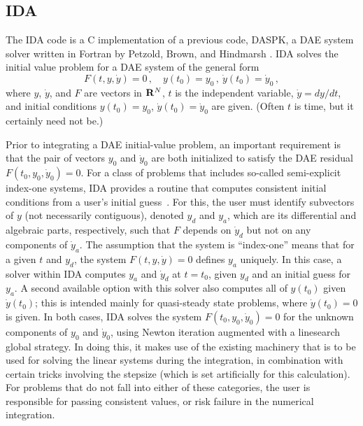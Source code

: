 \subsection{IDA}\label{ss:IDA}

The IDA code is a C implementation of a previous code, DASPK, a DAE
system solver written in Fortran by Petzold, Brown, and Hindmarsh
\cite{BHP:94,BCP:96}.  IDA solves the initial value problem for 
a DAE system of the general form
\begin{equation}\label{e:DAE}
  F(t,y,{\dot y}) = 0 \, ,
  \quad y(t_0) = y_0 \, ,~ {\dot y}(t_0) = {\dot y}_0 \, ,
\end{equation}
where $y$, ${\dot y}$, and $F$ are vectors in ${\bf R}^N$, $t$ is the independent
variable, ${\dot y} = dy/dt$, 
and initial conditions $y(t_0) = y_0$, ${\dot y}(t_0) = {\dot y}_0$ 
are given.  (Often $t$ is time, but it certainly need not be.)

Prior to integrating a DAE initial-value problem, an important requirement 
is that the pair of vectors $y_0$ and ${\dot y_0}$ are both initialized to
satisfy the DAE residual $F(t_0,y_0, {\dot y}_0) = 0$.
For a class of problems that includes so-called
semi-explicit index-one systems, IDA provides a routine that computes
consistent initial conditions from a user's initial guess~\cite{BHP:98}.  
For this, the user must identify subvectors of $y$
(not necessarily contiguous), denoted $y_d$ and $y_a$, which are its
differential and algebraic parts, respectively, such that $F$ depends
on ${\dot y}_d$ but not on any components of ${\dot y}_a$.  The assumption that
the system is ``index-one'' means that for a given $t$ and $y_d$, the
system $F(t,y,{\dot y}) = 0$ defines $y_a$ uniquely.  In this case, a solver
within IDA computes $y_a$ and ${\dot y}_d$ at $t = t_0$, given $y_d$ and an
initial guess for $y_a$.  A second available option with this solver
also computes all of $y(t_0)$ given ${\dot y}(t_0)$; this is intended mainly
for quasi-steady state problems, where ${\dot y}(t_0) = 0$ is given.
In both cases, IDA solves the system $F(t_0,y_0, {\dot y}_0) = 0$ for the
unknown components of $y_0$ and ${\dot y}_0$, using Newton iteration
augmented with a linesearch global strategy.  In doing this, it makes
use of the existing machinery that is to be used for solving the
linear systems during the integration, in combination with certain
tricks involving the stepsize (which is set artificially for this
calculation).
For problems that do not fall into either of these categories, the
user is responsible for passing consistent values, or risk failure in
the numerical integration.


